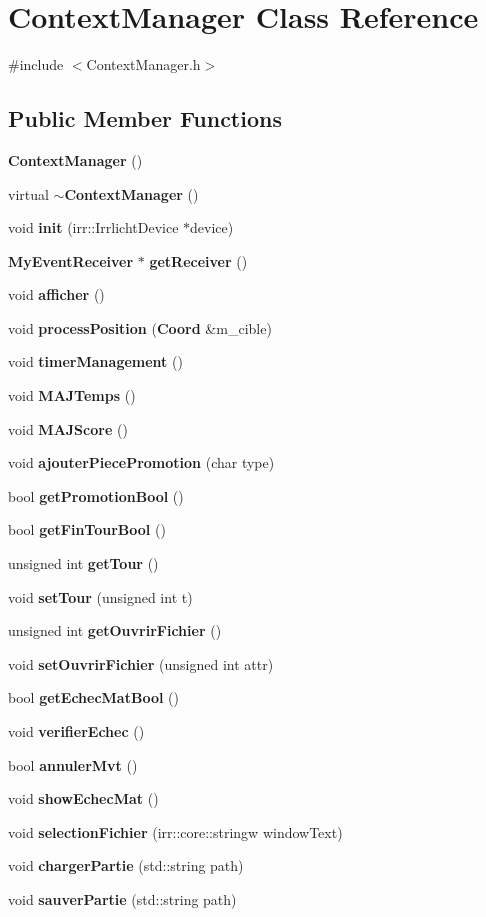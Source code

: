 \section{\-Context\-Manager \-Class \-Reference}
\label{class_context_manager}


{\ttfamily \#include $<$\-Context\-Manager.\-h$>$}

\subsection*{\-Public \-Member \-Functions}
\begin{DoxyCompactItemize}
\item 
{\bf \-Context\-Manager} ()
\item 
virtual {\bf $\sim$\-Context\-Manager} ()
\item 
void {\bf init} (irr\-::\-Irrlicht\-Device $\ast$device)
\item 
{\bf \-My\-Event\-Receiver} $\ast$ {\bf get\-Receiver} ()
\item 
void {\bf afficher} ()
\item 
void {\bf process\-Position} ({\bf \-Coord} \&m\-\_\-cible)
\item 
void {\bf timer\-Management} ()
\item 
void {\bf \-M\-A\-J\-Temps} ()
\item 
void {\bf \-M\-A\-J\-Score} ()
\item 
void {\bf ajouter\-Piece\-Promotion} (char type)
\item 
bool {\bf get\-Promotion\-Bool} ()
\item 
bool {\bf get\-Fin\-Tour\-Bool} ()
\item 
unsigned int {\bf get\-Tour} ()
\item 
void {\bf set\-Tour} (unsigned int t)
\item 
unsigned int {\bf get\-Ouvrir\-Fichier} ()
\item 
void {\bf set\-Ouvrir\-Fichier} (unsigned int attr)
\item 
bool {\bf get\-Echec\-Mat\-Bool} ()
\item 
void {\bf verifier\-Echec} ()
\item 
bool {\bf annuler\-Mvt} ()
\item 
void {\bf show\-Echec\-Mat} ()
\item 
void {\bf selection\-Fichier} (irr\-::core\-::stringw window\-Text)
\item 
void {\bf charger\-Partie} (std\-::string path)
\item 
void {\bf sauver\-Partie} (std\-::string path)
\end{DoxyCompactItemize}

